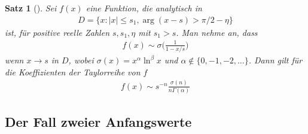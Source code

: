 \documentclass[a4paper, 10pt, ngerman]{article}
\newtheorem{theorem}{Satz}
\begin{document}
\begin{theorem}[\cite{fo90}]
    \label{theorem:analytic-combinatorics}
    Sei $f(x)$ eine Funktion, die analytisch in
    \begin{align*}
        D = \{x : |x| \le s_1, \arg(x - s) > \pi/2 - \eta \}
    \end{align*}
    ist, für positive reelle Zahlen $s, s_1, \eta$ mit $s_1 > s$. Man nehme an, dass
    \begin{align*}
        f(x) \sim \sigma \bigg ( \frac 1 {1 - x/s} \bigg )
    \end{align*}
    wenn $x \to s$ in $D$, wobei $\sigma(x) = x^\alpha \ln^\beta x$ und $\alpha \notin \{0, -1, -2, \dots\}$. Dann gilt für die Koeffizienten der Taylorreihe von $f$
    \begin{align*}
        [x^n]f(x) \sim s^{-n} \frac {\sigma(n)}{n\Gamma(\alpha)}
    \end{align*}
\end{theorem}

\subsection{Der Fall zweier Anfangswerte}
\end{document}
